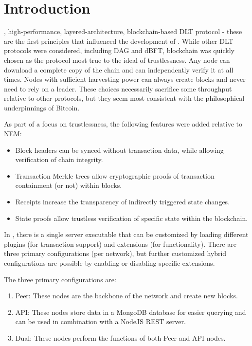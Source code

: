 \section{Introduction}
\label{sec:introduction}


, high-performance, layered-architecture, blockchain-based DLT protocol - these are the first principles that influenced the development of \codename.
While other DLT protocols were considered, including DAG and dBFT, blockchain was quickly chosen as the protocol most true to the ideal of trustlessness.
Any node can download a complete copy of the chain and can independently verify it at all times.
Nodes with sufficient harvesting power can always create blocks and never need to rely on a leader.
These choices necessarily sacrifice some throughput relative to other protocols, but they seem most consistent with the philosophical underpinnings of Bitcoin\cite{nakamoto2009}.

As part of a focus on trustlessness, the following features were added relative to NEM:
\begin{itemize}
	\item{Block headers can be synced without transaction data, while allowing verification of chain integrity.}
	\item{Transaction Merkle trees allow cryptographic proofs of transaction containment (or not) within blocks.}
	\item{Receipts increase the transparency of indirectly triggered state changes.}
	\item{State proofs allow trustless verification of specific state within the blockchain.}
\end{itemize}

In \codename, there is a single server executable that can be customized by loading different plugins (for transaction support) and extensions (for functionality).
There are three primary configurations (per network), but further customized hybrid configurations are possible by enabling or disabling specific extensions.

The three primary configurations are:
\begin{enumerate}
	\item{Peer: These nodes are the backbone of the network and create new blocks.}
	\item{API: These nodes store data in a MongoDB database for easier querying and can be used in combination with a NodeJS REST server.}
	\item{Dual: These nodes perform the functions of both Peer and API nodes.}
\end{enumerate}

